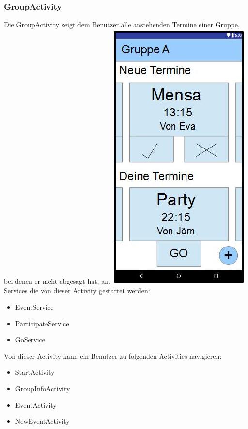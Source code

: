 	\subsubsection {GroupActivity}
	Die GroupActivity zeigt dem Benutzer alle anstehenden Termine einer Gruppe, bei denen er nicht abgesagt hat, an.
	\newline
	\includegraphics[width=.3\textwidth]{GUI_Group.jpg}
	\newline
	Services die von dieser Activity gestartet werden:
	\begin{itemize}
	\item EventService
	\item ParticipateService
	\item GoService
	\end{itemize}
	Von dieser Activity kann ein Benutzer zu folgenden Activities navigieren:
	\begin{itemize} 
	 \item StartActivity
	 \item GroupInfoActivity
	 \item EventActivity
	 \item NewEventActivity
	\end{itemize} 
	
